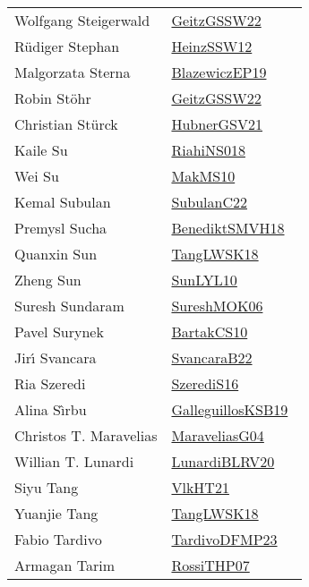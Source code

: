 {\begin{longtable}{p{4cm}p{20cm}}
Wolfgang Steigerwald & \href{works/GeitzGSSW22.pdf}{GeitzGSSW22}~\cite{GeitzGSSW22}\\
R{\"{u}}diger Stephan & \href{works/HeinzSSW12.pdf}{HeinzSSW12}~\cite{HeinzSSW12}\\
Malgorzata Sterna & \href{}{BlazewiczEP19}~\cite{BlazewiczEP19}\\
Robin St{\"{o}}hr & \href{works/GeitzGSSW22.pdf}{GeitzGSSW22}~\cite{GeitzGSSW22}\\
Christian St{\"{u}}rck & \href{works/HubnerGSV21.pdf}{HubnerGSV21}~\cite{HubnerGSV21}\\
Kaile Su & \href{works/RiahiNS018.pdf}{RiahiNS018}~\cite{RiahiNS018}\\
Wei Su & \href{works/MakMS10.pdf}{MakMS10}~\cite{MakMS10}\\
Kemal Subulan & \href{works/SubulanC22.pdf}{SubulanC22}~\cite{SubulanC22}\\
Premysl Sucha & \href{works/BenediktSMVH18.pdf}{BenediktSMVH18}~\cite{BenediktSMVH18}\\
Quanxin Sun & \href{works/TangLWSK18.pdf}{TangLWSK18}~\cite{TangLWSK18}\\
Zheng Sun & \href{works/SunLYL10.pdf}{SunLYL10}~\cite{SunLYL10}\\
Suresh Sundaram & \href{works/SureshMOK06.pdf}{SureshMOK06}~\cite{SureshMOK06}\\
Pavel Surynek & \href{works/BartakCS10.pdf}{BartakCS10}~\cite{BartakCS10}\\
Jir{\'{\i}} Svancara & \href{works/SvancaraB22.pdf}{SvancaraB22}~\cite{SvancaraB22}\\
Ria Szeredi & \href{works/SzerediS16.pdf}{SzerediS16}~\cite{SzerediS16}\\
Alina S{\^{\i}}rbu & \href{works/GalleguillosKSB19.pdf}{GalleguillosKSB19}~\cite{GalleguillosKSB19}\\
Christos T. Maravelias & \href{works/MaraveliasG04.pdf}{MaraveliasG04}~\cite{MaraveliasG04}\\
Willian T. Lunardi & \href{works/LunardiBLRV20.pdf}{LunardiBLRV20}~\cite{LunardiBLRV20}\\
Siyu Tang & \href{works/VlkHT21.pdf}{VlkHT21}~\cite{VlkHT21}\\
Yuanjie Tang & \href{works/TangLWSK18.pdf}{TangLWSK18}~\cite{TangLWSK18}\\
Fabio Tardivo & \href{works/TardivoDFMP23.pdf}{TardivoDFMP23}~\cite{TardivoDFMP23}\\
Armagan Tarim & \href{works/RossiTHP07.pdf}{RossiTHP07}~\cite{RossiTHP07}\\

\end{longtable}}
